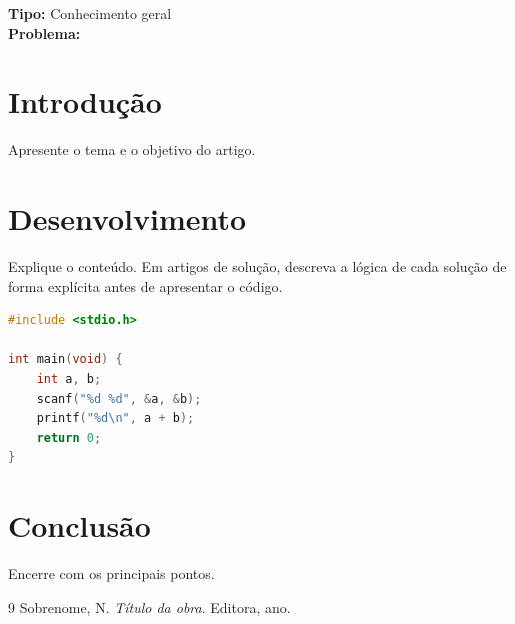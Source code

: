 \documentclass[12pt,a4paper]{article}
\title{\titulo}
\author{\autores}
\date{\today}
\newcommand{\tipoartigo}{Conhecimento geral} %
\newcommand{\linkproblema}{} %
\begin{document}
\maketitle

\begin{center}
  \textbf{Tipo:} \tipoartigo \\
  \ifx\linkproblema\empty\else \textbf{Problema:} \url{\linkproblema} \fi
\end{center}

\begin{abstract}
Resumo do artigo em poucas linhas.
\end{abstract}

\section{Introdução}
Apresente o tema e o objetivo do artigo.

\section{Desenvolvimento}
Explique o conteúdo. Em artigos de solução, descreva a lógica de cada solução de forma explícita
antes de apresentar o código.

\begin{lstlisting}[language=C, caption={Exemplo de código em C}]
#include <stdio.h>

int main(void) {
    int a, b;
    scanf("%d %d", &a, &b);
    printf("%d\n", a + b);
    return 0;
}
\end{lstlisting}

\section{Conclusão}
Encerre com os principais pontos.

\begin{thebibliography}{9}
 Sobrenome, N. \textit{Título da obra}. Editora, ano.
\end{thebibliography}
\end{document}
